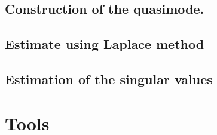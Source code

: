 \documentclass[10pt]{article}
\newcommand{\cL}{\mathcal{L}}
\newcommand{\e}{\mathrm{e}}
\newcommand{\1}{\mathbbm 1}
\newtheorem{definition}{Definition}
\begin{document}
        \subsection{Construction of the quasimode.}

        \subsection{Estimate using Laplace method}

        \subsection{Estimation of the singular values}

    \section{Tools}

\end{document}
